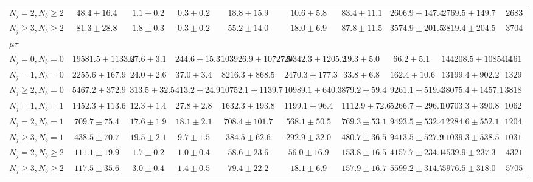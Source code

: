 \begin{sidewaystable}[]
{\begin{tabular}{l|ccccccc|cc}
        $N_{j} = 2, N_{b} \geq 2$       & $48.4 \pm 16.4$      & $1.1 \pm 0.2$    & $0.3 \pm 0.2$    & $18.8 \pm 15.9$        & $10.6 \pm 5.8$       & $83.4 \pm 11.1$   & $2606.9 \pm 147.4$ & $2769.5 \pm 149.7$     & $2683$   \\
        $N_{j} \geq 3, N_{b} \geq 2$    & $81.3 \pm 28.8$      & $1.8 \pm 0.3$    & $0.3 \pm 0.2$    & $55.2 \pm 14.0$        & $18.0 \pm 6.9$       & $87.8 \pm 11.5$   & $3574.9 \pm 201.5$ & $3819.4 \pm 204.5$     & $3704$   \\
        \hline
        \multicolumn{10}{l}{$\mu\tau$} \\
        \hline
        $N_{j} = 0, N_{b} = 0$          & $19581.5 \pm 1133.6$ & $27.6 \pm 3.1$   & $244.6 \pm 15.3$ & $103926.9 \pm 10727.5$ & $20342.3 \pm 1205.2$ & $19.3 \pm 5.0$    & $66.2 \pm 5.1$     & $144208.5 \pm 10854.4$ & $146128$ \\
        $N_{j} = 1, N_{b} = 0$          & $2255.6 \pm 167.9$   & $24.0 \pm 2.6$   & $37.0 \pm 3.4$   & $8216.3 \pm 868.5$     & $2470.3 \pm 177.3$   & $33.8 \pm 6.8$    & $162.4 \pm 10.6$   & $13199.4 \pm 902.2$    & $13293$  \\
        $N_{j} \geq 2, N_{b} = 0$       & $5467.2 \pm 372.9$   & $313.5 \pm 32.5$ & $413.2 \pm 24.9$ & $10752.1 \pm 1139.7$   & $10989.1 \pm 640.3$  & $879.2 \pm 59.4$  & $9261.1 \pm 519.4$ & $38075.4 \pm 1457.1$   & $38184$  \\
        $N_{j} = 1, N_{b} = 1$          & $1452.3 \pm 113.6$   & $12.3 \pm 1.4$   & $27.8 \pm 2.8$   & $1632.3 \pm 193.8$     & $1199.1 \pm 96.4$    & $1112.9 \pm 72.6$ & $5266.7 \pm 296.1$ & $10703.3 \pm 390.8$    & $10628$  \\
        $N_{j} = 2, N_{b} = 1$          & $709.7 \pm 75.4$     & $17.6 \pm 1.9$   & $18.1 \pm 2.1$   & $708.4 \pm 101.7$      & $568.1 \pm 50.5$     & $769.3 \pm 53.1$  & $9493.5 \pm 532.4$ & $12284.6 \pm 552.1$    & $12048$  \\
        $N_{j} \geq 3, N_{b} = 1$       & $438.5 \pm 70.7$     & $19.5 \pm 2.1$   & $9.7 \pm 1.5$    & $384.5 \pm 62.6$       & $292.9 \pm 32.0$     & $480.7 \pm 36.5$  & $9413.5 \pm 527.9$ & $11039.3 \pm 538.5$    & $10314$  \\
        $N_{j} = 2, N_{b} \geq 2$       & $111.1 \pm 19.9$     & $1.7 \pm 0.2$    & $1.0 \pm 0.4$    & $58.6 \pm 23.6$        & $56.0 \pm 16.9$      & $153.8 \pm 16.5$  & $4157.7 \pm 234.1$ & $4539.9 \pm 237.3$     & $4321$   \\
        $N_{j} \geq 3, N_{b} \geq 2$    & $117.5 \pm 35.6$     & $3.0 \pm 0.4$    & $1.4 \pm 0.5$    & $79.4 \pm 22.2$        & $18.1 \pm 6.9$       & $157.9 \pm 16.7$  & $5599.2 \pm 314.7$ & $5976.5 \pm 318.0$     & $5705$   \\
        \hline
    \end{tabular}}

    \label{tab:yields_ltau}
\end{sidewaystable}

